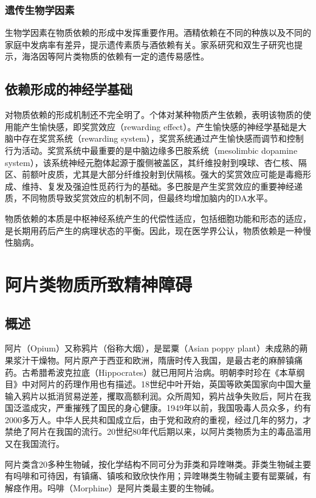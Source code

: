 \subsubsection{遗传生物学因素}

生物学因素在物质依赖的形成中发挥重要作用。酒精依赖在不同的种族以及不同的家庭中发病率有差异，提示遗传素质与酒依赖有关。家系研究和双生子研究也提示，海洛因等阿片类物质的依赖有一定的遗传易感性。

\subsection{依赖形成的神经学基础}

对物质依赖的形成机制还不完全明了。个体对某种物质产生依赖，表明该物质的使用能产生愉快感，即奖赏效应（rewarding
effect）。产生愉快感的神经学基础是大脑中存在奖赏系统（rewarding
system），奖赏系统通过产生愉快感而调节和控制行为活动。奖赏系统中最重要的是中脑边缘多巴胺系统（mesolimbic
dopamine
system），该系统神经元胞体起源于腹侧被盖区，其纤维投射到嗅球、杏仁核、隔区、前额叶皮质，尤其是大部分纤维投射到伏隔核。强大的奖赏效应可能是毒瘾形成、维持、复发及强迫性觅药行为的基础。多巴胺是产生奖赏效应的重要神经递质，不同物质导致奖赏效应的机制不同，但最终均增加脑内的DA水平。

物质依赖的本质是中枢神经系统产生的代偿性适应，包括细胞功能和形态的适应，是长期用药后产生的病理状态的平衡。因此，现在医学界公认，物质依赖是一种慢性脑病。

\section{阿片类物质所致精神障碍}

\subsection{概述}

阿片（Opium）又称鸦片（俗称大烟），是罂粟（Asian poppy
plant）未成熟的蒴果浆汁干燥物。阿片原产于西亚和欧洲，隋唐时传入我国，是最古老的麻醉镇痛药。古希腊希波克拉底（Hippocrates）就已用阿片治病。明朝李时珍在《本草纲目》中对阿片的药理作用也有描述。18世纪中叶开始，英国等欧美国家向中国大量输入鸦片以抵消贸易逆差，攫取高额利润。众所周知，鸦片战争失败后，阿片在我国泛滥成灾，严重摧残了国民的身心健康。1949年以前，我国吸毒人员众多，约有2000多万人。中华人民共和国成立后，由于党和政府的重视，经过几年的努力，才禁绝了阿片在我国的流行。20世纪80年代后期以来，以阿片类物质为主的毒品滥用又在我国流行。

阿片类含20多种生物碱，按化学结构不同可分为菲类和异喹啉类。菲类生物碱主要有吗啡和可待因，有镇痛、镇咳和致欣快作用；异喹啉类生物碱主要有罂粟碱，有解痉作用。吗啡（Morphine）是阿片类最主要的生物碱。

